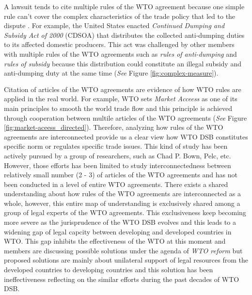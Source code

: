 A lawsuit tends to cite multiple rules of the WTO agreement because one simple rule can't cover the complex characteristics of the trade policy that led to the dispute \citep{palmeter2004dispute}.
For example, the United States enacted \textit{Continued Dumping and Subsidy Act of 2000} (CDSOA) that distributes
the collected anti-dumping duties to its affected domestic producers.
This act was challenged by other members with multiple rules of
the WTO agreements such as \textit{rules of anti-dumping} and \textit{rules of subsidy} because
this distribution could constitute an illegal subsidy and anti-dumping duty at the same time (\textit{See} Figure \ref{fig:complex-measure}).

Citation of articles of the WTO agreements are evidence of how WTO rules are applied in the real world. 
For example, WTO sets \textit{Market Acceess} as one of its main principles to smooth the world  trade flow
and this principle is achieved through cooperation between multile articles of the WTO agreements (\textit{See} Figure \ref{fig:market-aceess_directed}).
Therefore, analyzing how rules of the WTO agreements are interconnected provide us a clear view how WTO DSB constitutes specific norm or regulates specific trade issues. 
This kind of study has been actively pursued by a group of researchers, such as Chad P. Bown, Pelc, etc. However, those efforts has been limited to 
study interconnectedness between relatively small number (2 - 3) of articles of the WTO agreements and has not been conducted in a level of entire WTO agreements.
There exists a shared understanding about how rules of the WTO agreements are interconnected as a whole, however, this entire map of understanding is exclusively shared among a group of legal experts of the WTO agreements.
This exclusiveness keep becoming more severe as the jurisprudence of the WTO DSB evolves and this leads to a widening gap of legal capcity between developing and developed countries in WTO. 
This gap inhibits the effectiveness of the WTO at this moment and members are discussing possible solutions under the agenda of \textit{WTO reform} 
but proposed solutions are mainly about unilateral support of legal resources from the developed countries to developing countries and this solution has been ineffectiveness reflecting on the similar efforts during the past decades of WTO DSB.





